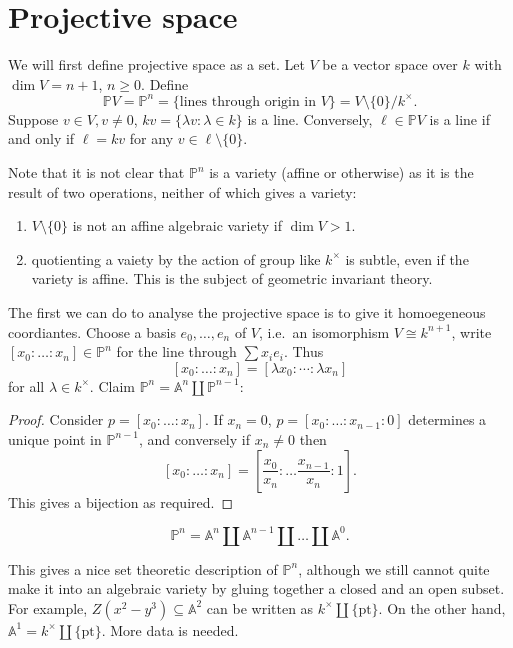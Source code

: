 \documentclass[a4paper]{article}
\renewcommand{\A}{\mathbb{A}}
\renewcommand*{\P}{\mathbb{P}}
\begin{document}
\section{Projective space}

We will first define projective space as a set. Let \(V\) be a vector space over \(k\) with \(\dim V = n + 1\), \(n \geq 0\). Define
\[
  \P V = \P^n = \{\text{lines through origin in } V\} = V \setminus \{0\}/k^\times.
\]
Suppose \(v \in V, v \neq 0\), \(kv = \{\lambda v: \lambda \in k\}\) is a line. Conversely, \(\ell \in \P V\) is a line if and only if \(\ell = kv\) for any \(v \in \ell \setminus \{0\}\).

Note that it is not clear that \(\P^n\) is a variety (affine or otherwise) as it is the result of two operations, neither of which gives a variety:
  \begin{enumerate}
  \item \(V \setminus \{0\}\) is not an affine algebraic variety if \(\dim V > 1\).
  \item quotienting a vaiety by the action of group like \(k^\times\) is subtle, even if the variety is affine. This is the subject of geometric invariant theory.
  \end{enumerate}

The first we can do to analyse the projective space is to give it homoegeneous coordiantes. Choose a basis \(e_0, \dots, e_n\) of \(V\), i.e.\ an isomorphism \(V \cong k^{n + 1}\), write \([x_0 : \dots : x_n] \in \P^n\) for the line through \(\sum x_i e_i\). Thus
\[
  [x_0: \dots : x_n] = [\lambda x_0 : \cdots : \lambda x_n]
\]
for all \(\lambda \in k^\times\). Claim \(\P^n = \A^n \amalg \P^{n - 1}\):
\begin{proof}
  Consider \(p = [x_0 : \dots : x_n]\). If \(x_n = 0\), \(p = [x_0 : \dots : x_{n - 1} : 0]\) determines a unique point in \(\P^{n - 1}\), and conversely if \(x_n \neq 0\) then
  \[
    [x_0 : \dots : x_n] = [\frac{x_0}{x_n} : \dots \frac{x_{n - 1}}{x_n} : 1].
  \]
  This gives a bijection as required.
\end{proof}

\begin{corollary}
  \[
    \P^n = \A^n \amalg \A^{n - 1} \amalg \dots \amalg \A^0.
  \]
\end{corollary}

This gives a nice set theoretic description of \(\P^n\), although we still cannot quite make it into an algebraic variety by gluing together a closed and an open subset. For example, \(Z(x^2 - y^3) \subseteq \A^2\) can be written as \(k^\times \amalg \{\text{pt}\}\). On the other hand, \(\A^1 = k^\times \amalg \{\text{pt}\}\). More data is needed.
\end{document}
